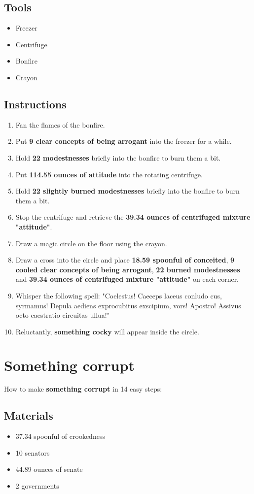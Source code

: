 \documentclass{article}
\begin{document}
\subsection{Tools}\begin{itemize}
\item 
Freezer
\item 
Centrifuge
\item 
Bonfire
\item 
Crayon
\end{itemize}
\subsection{Instructions}\begin{enumerate}
\item 
Fan the flames of the bonfire.
\item 
Put \textbf{9 clear concepts of being arrogant} into the freezer for a while.
\item 
Hold \textbf{22 modestnesses} briefly into the bonfire to burn them a bit.
\item 
Put \textbf{114.55 ounces of attitude} into the rotating centrifuge.
\item 
Hold \textbf{22 slightly burned modestnesses} briefly into the bonfire to burn them a bit.
\item 
Stop the centrifuge and retrieve the \textbf{39.34 ounces of centrifuged mixture "attitude"}.
\item 
Draw a magic circle on the floor using the crayon.
\item 
Draw a cross into the circle and place \textbf{18.59 spoonful of conceited}, \textbf{9 cooled clear concepts of being arrogant}, \textbf{22 burned modestnesses} and \textbf{39.34 ounces of centrifuged mixture "attitude"} on each corner.
\item 
Whisper the following spell: "Coelestus! Caeceps laceus conludo cus, syrmamus! Depula aediens exprocubitus exscipium, vors! Apostro! Assivus octo caestratio circuitas ullua!"
\item 
Reluctantly, \textbf{something cocky} will appear inside the circle.
\end{enumerate}
\newpage
\section{Something corrupt}How to make \textbf{something corrupt} in 14 easy steps:

\subsection{Materials}\begin{itemize}
\item 
37.34 spoonful of crookedness
\item 
10 senators
\item 
44.89 ounces of senate
\item 
2 governments
\end{itemize}
\end{document}
